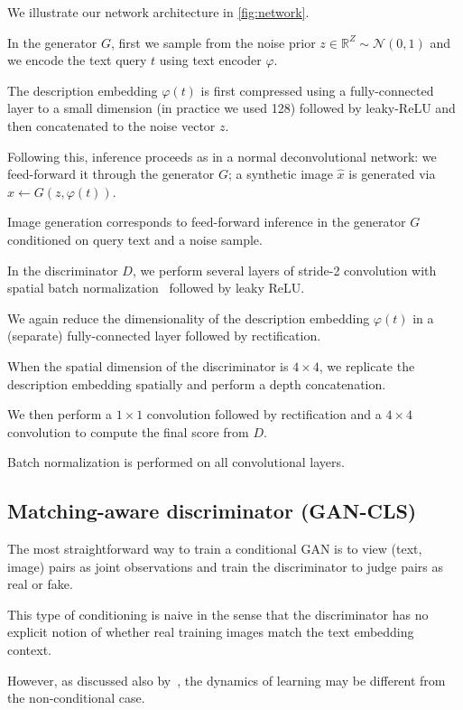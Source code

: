 We illustrate our network architecture in \autoref{fig:network}.

In the generator $G$, first we sample from the noise prior $z \in \mathbb{R}^{Z} \sim \mathcal{N}(0,1)$ and we encode the text query $t$ using text encoder $\varphi$.

The description embedding $\varphi(t)$ is first compressed using a fully-connected layer to a small dimension (in practice we used 128) followed by leaky-ReLU and then concatenated to the noise vector $z$.

Following this, inference proceeds as in a normal deconvolutional network: we feed-forward it through the generator $G$; a synthetic image $\hat{x}$ is generated via $\hat{x} \leftarrow G(z, \varphi(t))$.

Image generation corresponds to feed-forward inference in the generator $G$ conditioned on query text and a noise sample.

In the discriminator $D$, we perform several layers of stride-2 convolution with spatial batch normalization~\cite{ioffe2015batch} followed by leaky ReLU.

We again reduce the dimensionality of the description embedding $\varphi(t)$ in a (separate) fully-connected layer followed by rectification.

When the spatial dimension of the discriminator is $4 \times 4$, we replicate the description embedding spatially and perform a depth concatenation.

We then perform a $1 \times 1$ convolution followed by rectification and a $4 \times 4$ convolution to compute the final score from $D$.

Batch normalization is performed on all convolutional layers.

\subsection{Matching-aware discriminator (GAN-CLS)}
\label{subsec:GAN-CLS}

The most straightforward way to train a conditional GAN is to view (text, image) pairs as joint observations and train the discriminator to judge pairs as real or fake.

This type of conditioning is naive in the sense that the discriminator has no explicit notion of whether real training images match the text embedding context.

However, as discussed also by~\cite{gauthierconditional}, the dynamics of learning may be different from the non-conditional case.

